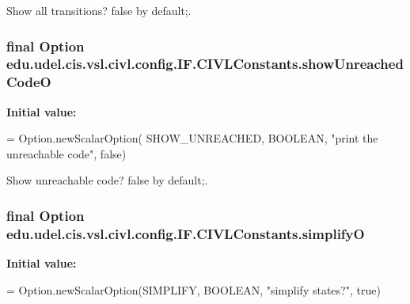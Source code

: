 Show all transitions? false by default;. 

\hypertarget{classedu_1_1udel_1_1cis_1_1vsl_1_1civl_1_1config_1_1IF_1_1CIVLConstants_accc88c5762fd5a991a929d99811577a0}{}
\subsubsection[{show\+Unreached\+Code\+O}]{\setlength{\rightskip}{0pt plus 5cm}final Option edu.\+udel.\+cis.\+vsl.\+civl.\+config.\+I\+F.\+C\+I\+V\+L\+Constants.\+show\+Unreached\+Code\+O\hspace{0.3cm}{\ttfamily [static]}}\label{classedu_1_1udel_1_1cis_1_1vsl_1_1civl_1_1config_1_1IF_1_1CIVLConstants_accc88c5762fd5a991a929d99811577a0}
{\bfseries Initial value\+:}
\begin{DoxyCode}
= Option.newScalarOption(
            SHOW\_UNREACHED, BOOLEAN, \textcolor{stringliteral}{"print the unreachable code"}, \textcolor{keyword}{false})
\end{DoxyCode}


Show unreachable code? false by default;. 

\hypertarget{classedu_1_1udel_1_1cis_1_1vsl_1_1civl_1_1config_1_1IF_1_1CIVLConstants_ad5ee73715de9137c565ef532bf4f88fa}{}
\subsubsection[{simplify\+O}]{\setlength{\rightskip}{0pt plus 5cm}final Option edu.\+udel.\+cis.\+vsl.\+civl.\+config.\+I\+F.\+C\+I\+V\+L\+Constants.\+simplify\+O\hspace{0.3cm}{\ttfamily [static]}}\label{classedu_1_1udel_1_1cis_1_1vsl_1_1civl_1_1config_1_1IF_1_1CIVLConstants_ad5ee73715de9137c565ef532bf4f88fa}
{\bfseries Initial value\+:}
\begin{DoxyCode}
= Option.newScalarOption(SIMPLIFY,
            BOOLEAN, \textcolor{stringliteral}{"simplify states?"}, \textcolor{keyword}{true})
\end{DoxyCode}


